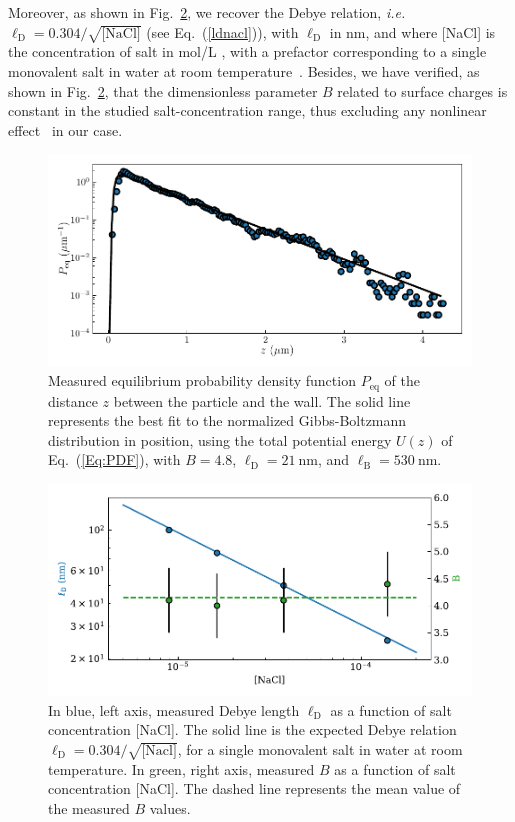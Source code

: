 Moreover, as shown in Fig.~\ref{fig.ld}, we recover the Debye relation, \textit{i.e.} $\ell_{\mathrm{D}}=0.304/\sqrt{\textrm{[NaCl]}}$ (see Eq.~(\ref{ldnacl})), with $\ell_{\mathrm{D}}$ in nm, and where [NaCl] is the concentration of salt in mol/L , with a prefactor corresponding to a single monovalent salt in water at room temperature~\cite{israelachvili_intermolecular_2015}. Besides, we have verified, as shown in Fig.~\ref{fig.ld}, that the dimensionless parameter $B$ related to surface charges is constant in the studied salt-concentration range, thus excluding any nonlinear effect~\cite{wang_measurement_2011,oberholzer_grand_1997} in our case. 

\begin{figure}[h!]
	\centering
	\includegraphics{02_body/chapter3/images/trajctory_analysis/pdf_exp.pdf}
	\caption{Measured equilibrium probability density function $P_{\textrm{eq}}$ of the distance $z$ between the particle and the wall. The solid line represents the best fit to the normalized Gibbs-Boltzmann distribution in position, using the total potential energy $U(z)$ of Eq.~(\ref{Eq:PDF}), with $B = 4.8$, $\ell_\mathrm{D} = 21 ~ \mathrm{nm}$, and $\ell_\mathrm{B} = 530~ \mathrm{nm}$.}
	\label{fig.pdf_exp}
\end{figure}


\begin{figure}[H]
	\centering
	\includegraphics{02_body/chapter3/images/trajctory_analysis/ld.pdf}
	\caption{In blue, left axis, measured Debye length $\ell_\mathrm{D}$ as a function of salt concentration [NaCl]. The solid line is the expected Debye relation $\ell_\mathrm{D}=0.304/\sqrt{\textrm{[Nacl]}}$, for a single monovalent salt in water at room temperature. In green, right axis, measured $B$ as a function of salt  concentration [NaCl]. The dashed line represents the mean value of the measured $B$ values.}
	\label{fig.ld}
\end{figure}


